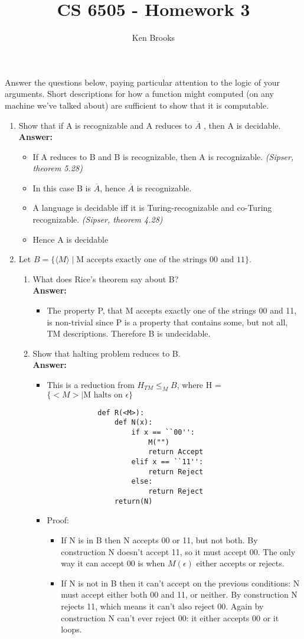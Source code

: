 \documentclass[12pt]{article}
\title{CS 6505 - Homework 3}
\author{Ken Brooks}
\begin{document}
\lstset{language=Python, tabsize = 4}
Answer the questions below, paying particular attention to the logic of your arguments. Short descriptions for how a function might computed (on any machine we’ve talked about) are sufficient to show that it is computable.
\begin{enumerate}
	\item Show that if A is recognizable and A reduces to $\overline{A}$ , then A is decidable.
	\\[.2in]\textbf{Answer:}
	\begin{itemize}
	\item If A reduces to B and B is recognizable, then A is recognizable. \textit{(Sipser, theorem 5.28)}
	\item In this case B is $\overline{A}$, hence $\overline{A}$ is recognizable.
	\item A language is decidable iff it is Turing-recognizable and co-Turing recognizable. \textit{(Sipser, theorem 4.28)}
	\item Hence A is decidable
	\end{itemize}
	\item Let $ B = \{\langle M \rangle \mid \mbox{M accepts exactly one of the strings 00 and 11\}}$.
		\begin{enumerate}
		\item What does Rice's theorem say about B?
			\\[.2in]\textbf{Answer:}
			\begin{itemize}
			\item The property P, that M accepts exactly one of the strings 00 and 11, is non-trivial since P is a property that contains some, but not all, TM descriptions. Therefore B is undecidable.
			\end{itemize}
		\item Show that halting problem reduces to B.
			\\[.2in]\textbf{Answer:}
			\begin{itemize}
			\item This is a reduction from $H_{TM} \leq_{M}B$, where H = $\{<M> \mid \mbox{M halts on } \epsilon\}$
			\begin{lstlisting}
			def R(<M>):
				def N(x):
					if x == ``00'':
						M("")
						return Accept
					elif x == ``11'':
						return Reject
					else:
						return Reject
				return(N)
			\end{lstlisting}
			\item Proof:
			\begin{itemize}
				\item If N is in B then N accepts 00 or 11, but not both.  By construction N doesn't accept 11, so it must accept 00.  The only way it can accept 00 is when $M(\epsilon)$ either accepts or rejects.
				\item If N is not in B then it can't accept on the previous conditions: N must accept either both 00 and 11, or neither. By construction N rejects 11, which means it can't also reject 00. Again by construction N can't ever reject 00: it either accepts 00 or it loops.
			\end{itemize}



\end{itemize}
\end{enumerate}
\end{enumerate}
\end{document}

